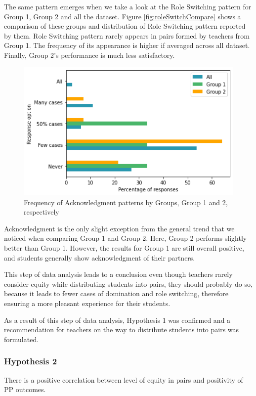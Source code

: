 \documentclass[conference]{IEEEtran}
\begin{document}
The same pattern emerges when we take a look at the Role Switching pattern for Group 1, Group 2 and all the dataset. Figure \ref{fig:roleSwitchCompare} shows a comparison of these groups and distribution of Role Switching pattern reported by them. Role Switching pattern rarely appears in pairs formed by teachers from Group 1. The frequency of its appearance is higher if averaged across all dataset. Finally, Group 2's performance is much less satisfactory.

\begin{figure}[ht]
\includegraphics[scale=0.5]{ack-comparison.png}
\caption{Frequency of Acknowledgment patterns by Groups, Group 1 and 2, respectively}
\label{fig:ackCompare}
\end{figure}

Acknowledgment is the only slight exception from the general trend that we noticed when comparing Group 1 and Group 2. Here, Group 2 performs slightly better than Group 1. However, the results for Group 1 are still overall positive, and students generally show acknowledgment of their partners.

This step of data analysis leads to a conclusion even though teachers rarely consider equity while distributing students into pairs, they should probably do so, because it leads to fewer cases of domination and role switching, therefore ensuring a more pleasant experience for their students. 

As a result of this step of data analysis, Hypothesis 1 was confirmed and a recommendation for teachers on the way to distribute students into pairs was formulated.

\subsubsection{Hypothesis 2}
There is a positive correlation between level of equity in pairs and positivity of PP outcomes.
\end{document}

